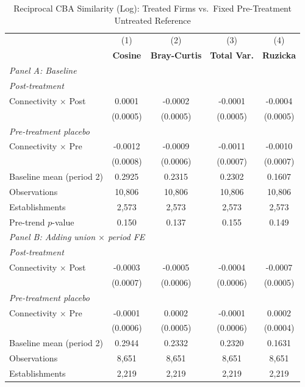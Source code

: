 \begin{table}[H]
\centering
\caption{Reciprocal CBA Similarity (Log): Treated Firms vs.\ Fixed Pre-Treatment Untreated Reference}
\label{tab:treated_pretreat_ref_uncorr_w_ln_cba_similarity}
\scriptsize
\setlength{\tabcolsep}{8pt}
\begin{tabular}{lcccc}
\toprule\toprule
 & (1) & (2) & (3) & (4) \\
 & \textbf{Cosine} & \textbf{Bray-Curtis} & \textbf{Total Var.} & \textbf{Ruzicka} \\
\midrule
\multicolumn{5}{l}{\textit{Panel A: Baseline}} \\
\multicolumn{5}{l}{\textit{Post-treatment}} \\
Connectivity $\times$ Post & 0.0001 & -0.0002 & -0.0001 & -0.0004 \\
 & (0.0005) & (0.0005) & (0.0005) & (0.0005) \\
\multicolumn{5}{l}{\textit{Pre-treatment placebo}} \\
Connectivity $\times$ Pre & -0.0012 & -0.0009 & -0.0011 & -0.0010 \\
 & (0.0008) & (0.0006) & (0.0007) & (0.0007) \\
\midrule
Baseline mean (period 2) & 0.2925 & 0.2315 & 0.2302 & 0.1607 \\
Observations &       10,806 &       10,806 &       10,806 &       10,806 \\
Establishments &        2,573 &        2,573 &        2,573 &        2,573 \\
Pre-trend $p$-value & 0.150 & 0.137 & 0.155 & 0.149 \\
\midrule
\multicolumn{5}{l}{\textit{Panel B: Adding union $\times$ period FE}} \\
\multicolumn{5}{l}{\textit{Post-treatment}} \\
Connectivity $\times$ Post & -0.0003 & -0.0005 & -0.0004 & -0.0007 \\
 & (0.0007) & (0.0006) & (0.0006) & (0.0005) \\
\multicolumn{5}{l}{\textit{Pre-treatment placebo}} \\
Connectivity $\times$ Pre & -0.0001 & 0.0002 & -0.0001 & 0.0002 \\
 & (0.0006) & (0.0005) & (0.0006) & (0.0004) \\
\midrule
Baseline mean (period 2) & 0.2944 & 0.2332 & 0.2320 & 0.1631 \\
Observations &        8,651 &        8,651 &        8,651 &        8,651 \\
Establishments &        2,219 &        2,219 &        2,219 &        2,219 \\

\end{tabular}
\end{table}
